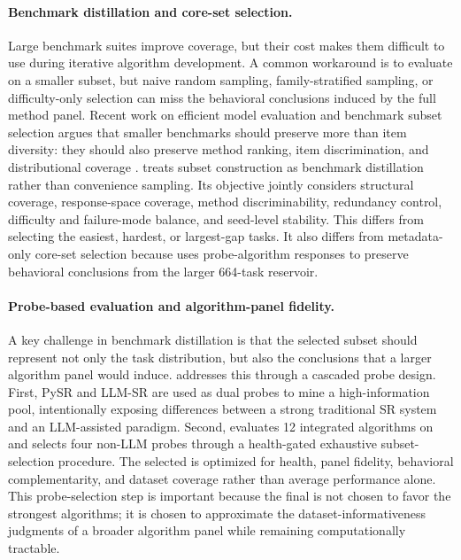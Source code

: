 \paragraph{Benchmark distillation and core-set selection.}
Large benchmark suites improve coverage, but their cost makes them difficult to use during iterative algorithm development. A common workaround is to evaluate on a smaller subset, but naive random sampling, family-stratified sampling, or difficulty-only selection can miss the behavioral conclusions induced by the full method panel. Recent work on efficient model evaluation and benchmark subset selection argues that smaller benchmarks should preserve more than item diversity: they should also preserve method ranking, item discrimination, and distributional coverage \citep{perlitz2024efficient,polo2024tinybenchmarks,vivek2024anchorpoints,saranathan2025sublime}. \arena{} treats subset construction as benchmark distillation rather than convenience sampling. Its \core{} objective jointly considers structural coverage, response-space coverage, method discriminability, redundancy control, difficulty and failure-mode balance, and seed-level stability. This differs from selecting the easiest, hardest, or largest-gap tasks. It also differs from metadata-only core-set selection because \arena{} uses probe-algorithm responses to preserve behavioral conclusions from the larger 664-task reservoir.

\paragraph{Probe-based evaluation and algorithm-panel fidelity.}
A key challenge in benchmark distillation is that the selected subset should represent not only the task distribution, but also the conclusions that a larger algorithm panel would induce. \arena{} addresses this through a cascaded probe design. First, PySR and LLM-SR are used as dual probes to mine a high-information \candidate{} pool, intentionally exposing differences between a strong traditional SR system and an LLM-assisted paradigm. Second, \arena{} evaluates 12 integrated algorithms on \candidate{} and selects four non-LLM probes through a health-gated exhaustive subset-selection procedure. The selected \probe{} is optimized for health, panel fidelity, behavioral complementarity, and dataset coverage rather than average performance alone. This probe-selection step is important because the final \core{} is not chosen to favor the strongest algorithms; it is chosen to approximate the dataset-informativeness judgments of a broader algorithm panel while remaining computationally tractable.

